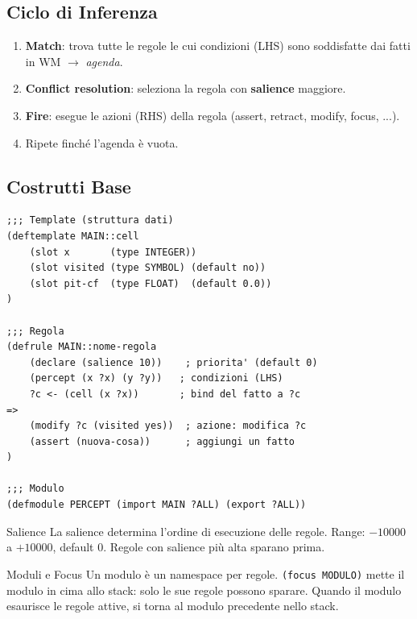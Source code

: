 \documentclass[12pt,a4paper]{article}
\begin{document}
\subsection{Ciclo di Inferenza}

\begin{enumerate}[noitemsep]
  \item \textbf{Match}: trova tutte le regole le cui condizioni (LHS) sono soddisfatte dai fatti in WM $\to$ \emph{agenda}.
  \item \textbf{Conflict resolution}: seleziona la regola con \textbf{salience} maggiore.
  \item \textbf{Fire}: esegue le azioni (RHS) della regola (assert, retract, modify, focus, ...).
  \item Ripete finché l'agenda è vuota.
\end{enumerate}

\subsection{Costrutti Base}

\begin{lstlisting}[language=CLIPS]
;;; Template (struttura dati)
(deftemplate MAIN::cell
    (slot x       (type INTEGER))
    (slot visited (type SYMBOL) (default no))
    (slot pit-cf  (type FLOAT)  (default 0.0))
)

;;; Regola
(defrule MAIN::nome-regola
    (declare (salience 10))    ; priorita' (default 0)
    (percept (x ?x) (y ?y))   ; condizioni (LHS)
    ?c <- (cell (x ?x))       ; bind del fatto a ?c
=>
    (modify ?c (visited yes))  ; azione: modifica ?c
    (assert (nuova-cosa))      ; aggiungi un fatto
)

;;; Modulo
(defmodule PERCEPT (import MAIN ?ALL) (export ?ALL))
\end{lstlisting}

\begin{defbox}{Salience}
La salience determina l'ordine di esecuzione delle regole. Range: $-10000$ a
$+10000$, default 0. Regole con salience più alta sparano prima.
\end{defbox}

\begin{defbox}{Moduli e Focus}
Un modulo è un namespace per regole. \texttt{(focus MODULO)} mette il modulo
in cima allo stack: solo le sue regole possono sparare. Quando il modulo esaurisce
le regole attive, si torna al modulo precedente nello stack.
\end{defbox}
\end{document}
